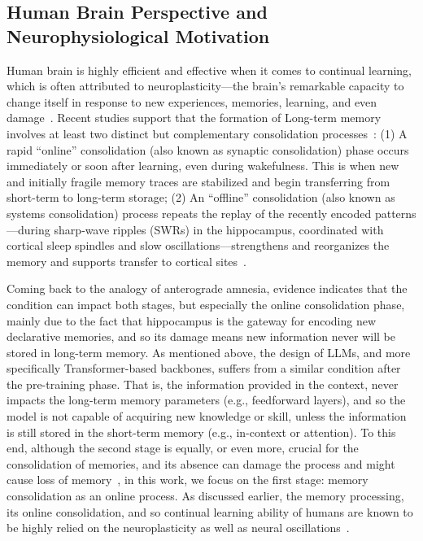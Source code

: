  

\subsection{Human Brain Perspective and Neurophysiological Motivation}\label{sec:brain-perspective}
Human brain is highly efficient and effective when it comes to continual learning, which is often attributed to neuroplasticity—the brain's remarkable capacity to change itself in response to new experiences, memories, learning, and even damage~\citep{pascual2005plastic, johnston2009plasticity}. Recent studies support that the formation of Long-term memory involves at least two distinct but complementary consolidation processes~\citep{Stepwise-consolidation2021, frey1997synaptic, yang2024selection}: (1) A rapid ``online'' consolidation (also known as synaptic consolidation) phase occurs immediately or soon after learning, even during wakefulness. This is when new and initially fragile memory traces are stabilized and begin transferring from short-term to long-term storage; (2) An ``offline'' consolidation (also known as systems consolidation) process repeats the replay of the recently encoded patterns—during sharp‑wave ripples (SWRs) in the hippocampus, coordinated with cortical sleep spindles and slow oscillations—strengthens and reorganizes the memory and supports transfer to cortical sites~\citep{ji2007coordinated, peyrache2009replay, foster2006reverse}. 


Coming back to the analogy of anterograde amnesia, evidence indicates that the condition can impact both stages, but especially the online consolidation phase, mainly due to the fact that hippocampus is the gateway for encoding new declarative memories, and so its damage means new information never will be stored in long-term memory. As mentioned above, the design of LLMs, and more specifically Transformer-based backbones, suffers from a similar condition after the pre-training phase. That is, the information provided in the context, never impacts the long-term memory parameters (e.g., feedforward layers), and so the model is not capable of acquiring new knowledge or skill, unless the information is still stored in the short-term memory (e.g., in-context or attention). To this end, although the second stage is equally, or even more, crucial for the consolidation of memories, and its absence can damage the process and might cause loss of memory~\citep{drummond2000altered, yoo2007deficit}, in this work, we focus on the first stage: memory consolidation as an online process. As discussed earlier, the memory processing, its online consolidation, and so continual learning ability of humans are known to be highly relied on the neuroplasticity as well as neural oscillations~\citep{bliss1993synaptic, buzsaki2004neuronal, klinzing2019mechanisms}.




